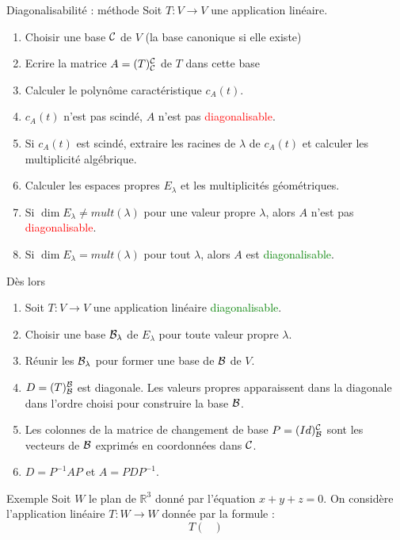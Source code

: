 \begin{parag}{Diagonalisabilité : méthode}
    Soit $T : V \to V$ une application linéaire.
    \begin{enumerate}
        \item Choisir une base $\mathcal{C}$ de $V$ (la base canonique si elle existe)
        \item Ecrire la matrice $A = (T)_{\mathcal{C}}^{\mathcal{C}}$ de $T$ dans cette base
        \item Calculer le polynôme caractéristique $c_A(t)$.
        \item $c_A(t)$ n'est pas scindé, $A$ n'est pas \textcolor{red}{diagonalisable}.
        \item Si $c_A(t)$ est scindé, extraire les racines de $\lambda$ de $c_A(t)$ et calculer les multiplicité algébrique.
        \item Calculer les espaces propres $E_\lambda$ et les multiplicités géométriques.
        \item Si $\dim E_\lambda \neq mult(\lambda)$ pour une valeur propre $\lambda$, alors $A$ n'est pas \textcolor{red}{diagonalisable}.
        \item Si $\dim E_\lambda = mult(\lambda)$ pour tout $\lambda$, alors $A$ est \textcolor{green}{diagonalisable}.
    \end{enumerate}
    Dès lors
    \begin{enumerate}
        \item Soit $T : V \to V$ une application linéaire \textcolor{green}{diagonalisable}.
        \item Choisir une base $\mathcal{B}_\lambda$ de $E_\lambda$ pour toute valeur propre $\lambda$.
        \item Réunir les $\mathcal{B}_\lambda$ pour former une base de $\mathcal{B}$ de $V$.
        \item $D = (T)_{\mathcal{B}}^{\mathcal{B}}$ est diagonale. Les valeurs propres apparaissent dans la diagonale dans l'ordre choisi pour construire la base $\mathcal{B}$.
        \item Les colonnes de la matrice de changement de base $P = (Id)_{\mathcal{B}}^{\mathcal{C}}$ sont les vecteurs de $\mathcal{B}$ exprimés en coordonnées dans $\mathcal{C}$.
        \item $D = P^{-1}AP$ et $A = PDP^{-1}$.
    \end{enumerate}
    \begin{subparag}{Exemple}
        Soit $W$ le plan de $\mathbb{R}^3$ donné par l'équation $x + y + z = 0$. On considère l'application linéaire $T: W \to W$ donnée par la formule :
        \[T\begin{pmatrix}

\end{pmatrix}\]
\end{subparag}
\end{parag}
